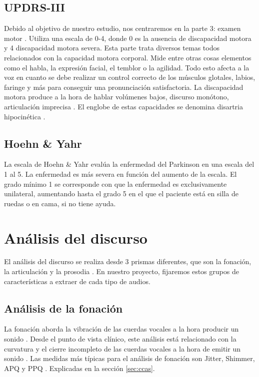 \subsection{UPDRS-III}
Debido al objetivo de nuestro estudio, nos centraremos en la parte 3: examen motor \cite{updrs3}. Utiliza una escala de 0-4, donde 0 es la ausencia de discapacidad motora y 4 discapacidad motora severa. Esta parte trata diversos temas todos relacionados con la capacidad motora corporal. Mide entre otras cosas elementos como el habla, la expresión facial, el temblor o la agilidad. Todo esto afecta a la voz en cuanto se debe realizar un control correcto de los músculos glotales, labios, faringe y más para conseguir una pronunciación satisfactoria. La discapacidad motora  produce a la hora de hablar volúmenes bajos, discurso monótono, articulación imprecisa \cite{Orz2016}. El englobe de estas capacidades se denomina disartria hipocinética \cite{disartia}.

\subsection{Hoehn \& Yahr}
La escala de Hoehn \& Yahr \cite{hoehn1967} evalúa la enfermedad del Parkinson en una escala del 1 al 5. La enfermedad es más severa en función del aumento de la escala. El grado mínimo 1 se corresponde con que la enfermedad es exclusivamente unilateral, aumentando hasta el grado 5 en el que el paciente está en silla de ruedas o en cama, si no tiene ayuda.

\section{Análisis del discurso}
El análisis del discurso se realiza desde 3 prismas diferentes, que son la fonación, la articulación y la prosodia \cite{speechAnalysis}. En nuestro proyecto, fijaremos estos grupos de características a extraer de cada tipo de audios.

\subsection{Análisis de la fonación}
La fonación aborda la vibración de las cuerdas vocales a la hora producir un sonido \cite{speechAnalysis}. Desde el punto de vista clínico, este análisis está relacionado con la curvatura y el cierre incompleto de las cuerdas vocales a la hora de emitir un sonido \cite{phonationfeat}. Las medidas más típicas para el análisis de fonación son Jitter, Shimmer, APQ y PPQ \cite{neurospeech}. Explicadas en la sección \ref{sec:ccas}.

